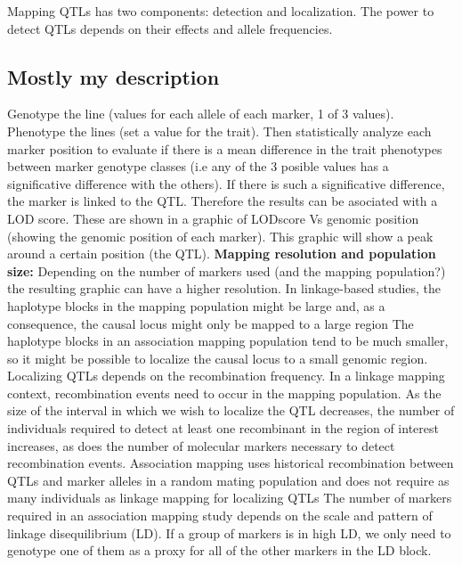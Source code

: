 \documentclass[a4paper,10pt]{article}
\begin{document}
Mapping QTLs has two components: detection and localization. The power to detect QTLs depends on their effects and allele frequencies.

\subsection{Mostly my description}
Genotype the line (values for each allele of each marker, 1 of 3 values). Phenotype the lines (set a value for the trait).
Then statistically analyze each marker position to evaluate if there is a mean difference in the trait phenotypes between marker genotype classes (i.e any of the 3 posible values has a significative difference with the others). 
If there is such a significative difference, the marker is linked to the QTL. Therefore the results can be asociated with a LOD score.
These are shown in a graphic of LODscore Vs genomic position (showing the genomic position of each marker).
This graphic will show a peak around a certain position (the QTL). 
\textbf{Mapping resolution and population size:} Depending on the number of markers used (and the mapping population?) the resulting graphic can have a higher resolution.
In linkage-based studies, the haplotype blocks in the mapping population might be large and, as a consequence, the causal locus might only be mapped to a large region
The haplotype blocks in an association mapping population tend to be much smaller, so it might be possible to localize the causal locus to a small genomic region.
Localizing QTLs depends on the recombination frequency. In a linkage mapping context, recombination events need to occur in the mapping population.
As the size of the interval in which we wish to localize the QTL decreases, the number of individuals required to detect at least one recombinant in the region of interest increases, as does the number of molecular markers necessary to detect recombination events.
Association mapping uses historical recombination between QTLs and marker alleles in a random mating population and does not require as many individuals as linkage mapping for localizing QTLs
The number of markers required in an association mapping study depends on the scale and pattern of linkage disequilibrium (LD). 
If a group of markers is in high LD, we only need to genotype one of them as a proxy for all of the other markers in the LD block.
\end{document}

